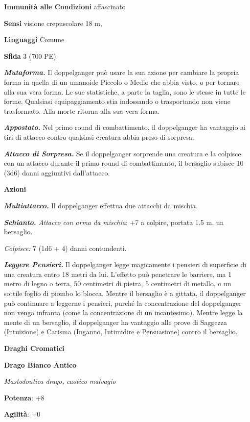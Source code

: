 \begin{multicols}{2}
\textbf{Immunità alle Condizioni} affascinato

\textbf{Sensi} visione crepuscolare 18 m, 

\textbf{Linguaggi} Comune

\textbf{Sfida} 3 (700 PE)

\emph{\textbf{Mutaforma.}} Il doppelganger può usare la sua azione per
cambiare la propria forma in quella di un umanoide Piccolo o Medio che
abbia visto, o per tornare alla sua vera forma. Le sue statistiche, a
parte la taglia, sono le stesse in tutte le forme. Qualsiasi
equipaggiamento stia indossando o trasportando non viene trasformato.
Alla morte ritorna alla sua vera forma.

\emph{\textbf{Appostato.}} Nel primo round di combattimento, il
doppelganger ha vantaggio ai tiri di attacco contro qualsiasi creatura
abbia preso di sorpresa.

\emph{\textbf{Attacco di Sorpresa.}} Se il doppelganger sorprende una
creatura e la colpisce con un attacco durante il primo round di
combattimento, il bersaglio subisce 10 (3d6) danni aggiuntivi
dall'attacco.

\textbf{Azioni}

\emph{\textbf{Multiattacco.}} Il doppelganger effettua due attacchi da
mischia.

\emph{\textbf{Schianto.} Attacco con arma da mischia}: +7 a colpire,
portata 1,5 m, un bersaglio.

\emph{Colpisce:} 7 (1d6 + 4) danni contundenti.

\emph{\textbf{Leggere Pensieri.}} Il doppelganger legge magicamente i
pensieri di superficie di una creatura entro 18 metri da lui. L'effetto
può penetrare le barriere, ma 1 metro di legno o terra, 50 centimetri di
pietra, 5 centimetri di metallo, o un sottile foglio di piombo lo
blocca. Mentre il bersaglio è a gittata, il doppelganger può continuare
a leggerne i pensieri, purché la concentrazione del doppelganger non
venga infranta (come la concentrazione di un incantesimo). Mentre legge
la mente di un bersaglio, il doppelganger ha vantaggio alle prove di
Saggezza (Intuizione) e Carisma (Inganno, Intimidire e Persuasione)
contro il bersaglio.

\textbf{Draghi Cromatici}

\textbf{Drago Bianco Antico}

\emph{Mastodontica drago, caotico malvagio}

\textbf{Potenza}: +8

\textbf{Agilità}: +0


\end{multicols}
